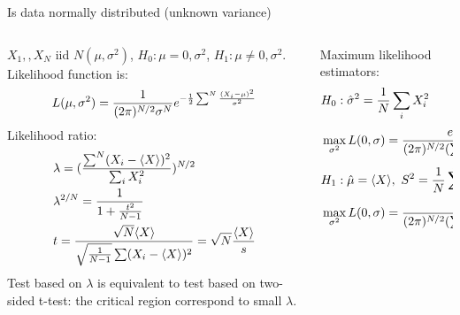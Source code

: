 \documentclass[asd-beamer.tex]{subfiles}
\begin{document}
\begin{wordonframe}{Is data normally distributed (unknown variance)}
\begin{columns}[T]
	\begin{column}{0.55\textwidth}
$X_1,,X_N$ iid $N(\mu,\sigma^2)$, $H_0: \mu=0,\sigma^2$, $H_1: \mu\neq0,\sigma^2$.
Likelihood function is: 
\begin{equation*}
L(\mu,\sigma^2)=\frac{1}{(2\pi)^{N/2}\sigma^N}e^{-\frac{1}{2}\sum^N\frac{(X_i-\mu)^2}{\sigma^2}}
\end{equation*}
Likelihood ratio:
\begin{align*}
&\lambda=(\frac{\sum^N(X_i-\langle X \rangle)^2}{\sum_iX_i^2})^{N/2}\\
&\lambda^{2/N}=\frac{1}{1+\frac{t^2}{N-1}}\\
&t=\frac{\sqrt{N}\langle X \rangle}{\sqrt{\frac{1}{N-1}}\sum(X_i-\langle X \rangle)^2}=\sqrt{N}\frac{\langle X \rangle}{s}
\end{align*}
Test based on $\lambda$ is equivalent to test based on two-sided t-test: the critical region correspond to small $\lambda$.
	\end{column}
	\begin{column}{0.45\textwidth}
Maximum likelihood estimators:
\begin{align*}
&H_0: \hat{\sigma}^2=\frac{1}{N}\sum_iX_i^2\\
&\max_{\sigma^2}L(0,\sigma)=\frac{e^{-N/2}}{(2\pi)^{N/2}(\sum_iX_i/N)^{N/2}}\\
&H_1: \hat{\mu}=\langle X \rangle,\ S^2=\frac{1}{N}\sum^N(X_i-\langle X \rangle)^2\\
&\max_{\sigma^2}L(0,\sigma)=\frac{e^{-N/2}}{(2\pi)^{N/2}(\sum_i(X_i-\langle X \rangle)^2/N)^{N/2}}\\
\end{align*}
	\end{column}
\end{columns}

\end{wordonframe}
\end{document}

